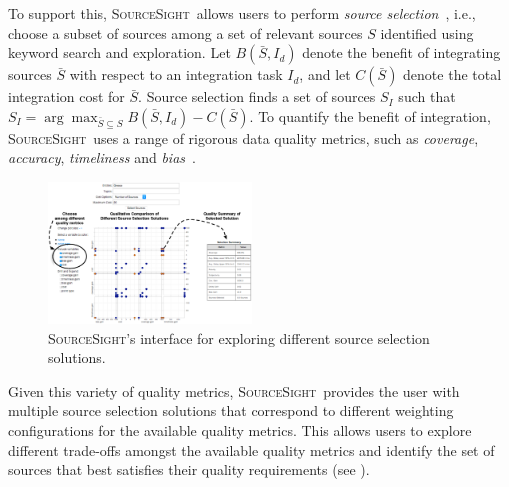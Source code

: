 \documentclass{vldb}
\newcommand\system{\textsc{SourceSight}}
\begin{document}
To support this, \system~allows users to perform {\em source selection}~\cite{dong:vldb13}, i.e., choose a subset of sources among a set of relevant sources $S$ identified using keyword search and exploration. Let $B(\bar{S},I_d)$ denote the benefit of integrating sources $\bar{S}$ with respect to an integration task $I_d$, and let $C(\bar{S})$ denote the total integration cost for $\bar{S}$. Source selection finds a set of sources $S_I$ such that $S_I = \arg\max_{\bar{S} \subseteq S}B(\bar{S},I_d) - C(\bar{S})$. To quantify the benefit of integration, \system~uses a range of rigorous data quality metrics, such as {\em coverage}, {\em accuracy}, {\em timeliness} and {\em bias}~\cite{rekatsinas:2015}. 


\begin{figure}
	\begin{center}
	\includegraphics[trim=0 0 0 85, clip,width=0.48\textwidth]{fig/ssResults}
	\vspace{-20pt}
	\caption{\system's interface for exploring different source selection solutions.}
	\label{fig:ssresults}
	\end{center}
	\vspace{-22pt}
\end{figure}

Given this variety of quality metrics, \system~provides the user with multiple source selection solutions that correspond to different weighting configurations for the available quality metrics. This allows users to explore different trade-offs amongst the available quality metrics and identify the set of sources that best satisfies their quality requirements (see ).
\end{document}
